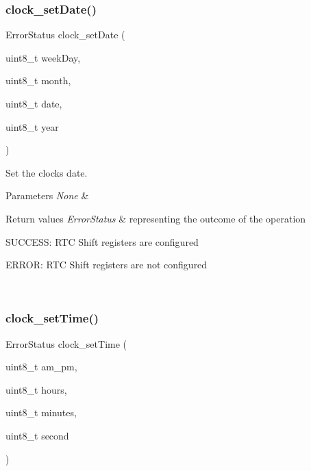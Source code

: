 \subsubsection{\texorpdfstring{clock\+\_\+set\+Date()}{clock\_setDate()}}
{\footnotesize\ttfamily Error\+Status clock\+\_\+set\+Date (\begin{DoxyParamCaption}\item[{uint8\+\_\+t}]{week\+Day,  }\item[{uint8\+\_\+t}]{month,  }\item[{uint8\+\_\+t}]{date,  }\item[{uint8\+\_\+t}]{year }\end{DoxyParamCaption})}



Set the clock\textquotesingle{}s date. 


\begin{DoxyParams}{Parameters}
{\em None} & \\
\hline
\end{DoxyParams}

\begin{DoxyRetVals}{Return values}
{\em Error\+Status} & representing the outcome of the operation
\begin{DoxyItemize}
\item S\+U\+C\+C\+E\+SS\+: R\+TC Shift registers are configured
\item E\+R\+R\+OR\+: R\+TC Shift registers are not configured 
\end{DoxyItemize}\\
\hline
\end{DoxyRetVals}
\mbox{\label{group___clock_ga11404197d58ddf6b46230bcde4282ef2}} 
\subsubsection{\texorpdfstring{clock\+\_\+set\+Time()}{clock\_setTime()}}
{\footnotesize\ttfamily Error\+Status clock\+\_\+set\+Time (\begin{DoxyParamCaption}\item[{uint8\+\_\+t}]{am\+\_\+pm,  }\item[{uint8\+\_\+t}]{hours,  }\item[{uint8\+\_\+t}]{minutes,  }\item[{uint8\+\_\+t}]{second }\end{DoxyParamCaption})}



